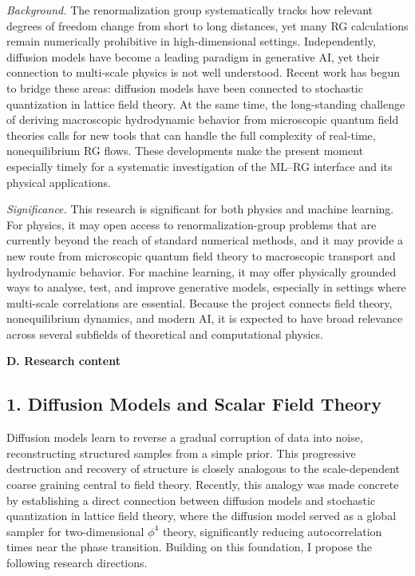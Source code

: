 \documentclass[11pt,a4paper]{article}
\begin{document}
\textit{Background.}
The renormalization group systematically tracks how relevant degrees of freedom change from short to long distances, yet many RG calculations remain numerically prohibitive in high-dimensional settings. Independently, diffusion models have become a leading paradigm in generative AI, yet their connection to multi-scale physics is not well understood. Recent work has begun to bridge these areas: diffusion models have been connected to stochastic quantization in lattice field theory\cite{Wang:2023exq}. At the same time, the long-standing challenge of deriving macroscopic hydrodynamic behavior from microscopic quantum field theories calls for new tools that can handle the full complexity of real-time, nonequilibrium RG flows. These developments make the present moment especially timely for a systematic investigation of the ML--RG interface and its physical applications.

\textit{Significance.}
This research is significant for both physics and machine learning. For physics, it may open access to renormalization-group problems that are currently beyond the reach of standard numerical methods, and it may provide a new route from microscopic quantum field theory to macroscopic transport and hydrodynamic behavior. For machine learning, it may offer physically grounded ways to analyse, test, and improve generative models, especially in settings where multi-scale correlations are essential. Because the project connects field theory, nonequilibrium dynamics, and modern AI, it is expected to have broad relevance across several subfields of theoretical and computational physics.

\vspace{0.5cm}
\textbf{D. Research content}

\subsection*{1. Diffusion Models and Scalar Field Theory}

Diffusion models\cite{SohlDickstein:2015,Ho:2020,Song:2021} learn to reverse a gradual corruption of data into noise, reconstructing structured samples from a simple prior. This progressive destruction and recovery of structure is closely analogous to the scale-dependent coarse graining central to field theory. Recently, this analogy was made concrete by establishing a direct connection between diffusion models and stochastic quantization in lattice field theory\cite{Wang:2023exq}, where the diffusion model served as a global sampler for two-dimensional $\phi^4$ theory, significantly reducing autocorrelation times near the phase transition. Building on this foundation, I propose the following research directions.
\end{document}
